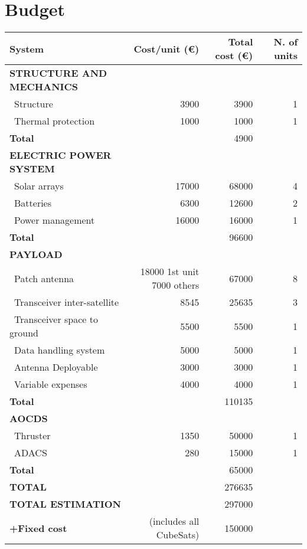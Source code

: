 \section{Budget}

\begin{longtable}{| l | r | r | r |}
\rowcolor[gray]{0.80}	\textbf{System} & \textbf{Cost/unit (\euro)} & \textbf{Total cost (\euro)} & \textbf{N. of units}\\
    \hline
    \endfirsthead


\rowcolor[gray]{0.85} \textbf{STRUCTURE AND MECHANICS} & & & \\
   ~Structure & 3900 & 3900 & 1 \\
   ~Thermal protection & 1000  & 1000 & 1\\
   \hline
   \rowcolor[gray]{0.95} \textbf{Total} &  & 4900 &  \\
   \hline
   
\rowcolor[gray]{0.85} \textbf{ELECTRIC POWER SYSTEM} & & & \\
   ~Solar arrays & 17000 & 68000 & 4 \\
   ~Batteries & 6300 & 12600 & 2 \\
   ~Power management & 16000 & 16000 & 1 \\
   \hline
   \rowcolor[gray]{0.95} \textbf{Total} & & 96600 &  \\
   \hline

\rowcolor[gray]{0.85} \textbf{PAYLOAD} & & & \\

   ~Patch antenna & \makecell{18000 1st unit \\ 7000 others} & 67000 & 8 \\
   ~Transceiver inter-satellite & 8545 & 25635 & 3 \\
   ~Transceiver space to ground & 5500  & 5500 & 1 \\
   ~Data handling system & 5000 & 5000 & 1\\
   ~Antenna Deployable & 3000 & 3000 & 1\\
   ~Variable expenses & 4000 & 4000 & 1\\
   \hline
   \rowcolor[gray]{0.95} \textbf{Total} & & 110135 & \\
   \hline
   
\rowcolor[gray]{0.85} \textbf{AOCDS} & & &\\

   ~Thruster & 1350 & 50000 & 1 \\
   ~ADACS & 280 & 15000 & 1 \\
   \hline
   \rowcolor[gray]{0.95} \textbf{Total} & & 65000 & \\
   \hline

\rowcolor[gray]{0.9} \textbf{TOTAL} & & 276635 & \\
\hline
\rowcolor[gray]{0.9} \textbf{TOTAL ESTIMATION} & & 297000 & \\
\hline
\rowcolor[gray]{0.9} \textbf{+Fixed cost} & (includes all CubeSats) & 150000 & \\
\hline

\end{longtable} 

